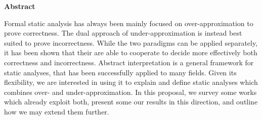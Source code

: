 \thispagestyle{plain}
\begin{center}
	\Large
	\textbf{Abstract}
\end{center}
Formal static analysis has always been mainly focused on over-approximation to prove correctness. The dual approach of under-approximation is instead best suited to prove incorrectness. While the two paradigms can be applied separately, it has been shown that their are able to cooperate to decide more effectively both correctness and incorrectness.
Abstract interpretation is a general framework for static analyses, that has been successfully applied to many fields. Given its flexibility, we are interested in using it to explain and define static analyses which combines over- and under-approximation.
In this proposal, we survey some works which already exploit both, present some our results in this direction, and outline how we may extend them further.
